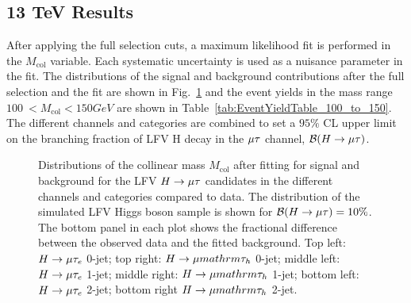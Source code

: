 \documentclass[oneside, letterpaper, oldfontcommands]{memoir}
\begin{document}
{{{\subsection{13 TeV Results}
After applying the full selection cuts, a maximum likelihood fit is performed in the $M_\text{col}$ variable. Each systematic uncertainty is used as a nuisance parameter in the fit. The distributions of the signal and background contributions after the full selection and the fit are shown in Fig.~\ref{fig:Mcol_SignalRegion} and the
event yields in the mass range $100\:  < M_\text{col} < 150GeV$ are shown in Table~\ref{tab:EventYieldTable_100_to_150}.
The different channels and categories are combined  to set a $95\%$ CL  upper limit on the branching
fraction of LFV H decay in the  $\mu\mathrm{\tau}$ channel, $\mathcal{B}(H\rightarrow\mu\mathrm{\tau})$.

\begin{figure}[hbtp]\centering
\caption{Distributions of the collinear mass $M_\text{col}$ after fitting for signal and background  for the LFV $H \rightarrow \mu \mathrm{\tau}$ candidates in
the different
channels and categories compared to data.
The distribution of the simulated LFV Higgs boson sample is shown for $\mathcal{B}(H \rightarrow \mu \mathrm{\tau} )=10\%$.
The bottom panel in each plot shows the fractional difference between the observed data and the fitted background. Top left: $H \rightarrow \mu \mathrm{\tau}_{e}$ 0-jet; top right: $H \rightarrow \mu mathrm{\tau_{h}}$ 0-jet;
middle left: $H \rightarrow \mu \mathrm{\tau}_{e}$ 1-jet; middle right: $H \rightarrow \mu mathrm{\tau_{h}}$ 1-jet; bottom left: $H \rightarrow \mu \mathrm{\tau}_{e}$ 2-jet;
bottom right $H \rightarrow \mu mathrm{\tau_{h}}$ 2-jet.}
 \label{fig:Mcol_SignalRegion}\end{figure}
 
}}}
\end{document}

